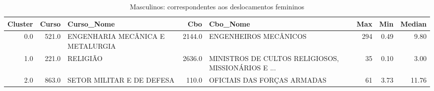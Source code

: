 \begin{table}
\centering
\caption{Masculinos: correspondentes aos deslocamentos femininos}
\label{tab:Salarios_Desequlibrio_F}
\begin{tabular}{rrlrlrrr}
\toprule
 Cluster &  Curso &                       Curso\_Nome &    Cbo &                                           Cbo\_Nome &  Max &  Min &  Median \\
\midrule
     0.0 &  521.0 & ENGENHARIA MECÂNICA E METALURGIA & 2144.0 &                              ENGENHEIROS MECÂNICOS &  294 & 0.49 &    9.80 \\
     1.0 &  221.0 &                         RELIGIÃO & 2636.0 & MINISTROS DE CULTOS RELIGIOSOS, MISSIONÁRIOS E ... &   35 & 0.10 &    3.00 \\
     2.0 &  863.0 &        SETOR MILITAR E DE DEFESA &  110.0 &                        OFICIAIS DAS FORÇAS ARMADAS &   61 & 3.73 &   11.76 \\
\bottomrule
\end{tabular}
\end{table}
